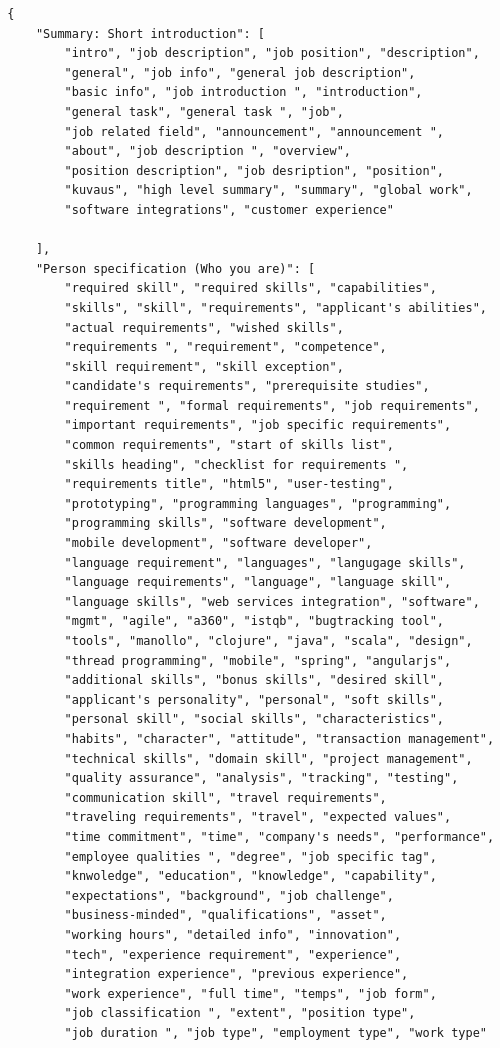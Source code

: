 \begin{verbatim}
  {
      "Summary: Short introduction": [
          "intro", "job description", "job position", "description",
          "general", "job info", "general job description",
          "basic info", "job introduction ", "introduction",
          "general task", "general task ", "job",
          "job related field", "announcement", "announcement ",
          "about", "job description ", "overview",
          "position description", "job desription", "position",
          "kuvaus", "high level summary", "summary", "global work",
          "software integrations", "customer experience"

      ],
      "Person specification (Who you are)": [
          "required skill", "required skills", "capabilities",
          "skills", "skill", "requirements", "applicant's abilities",
          "actual requirements", "wished skills",
          "requirements ", "requirement", "competence",
          "skill requirement", "skill exception",
          "candidate's requirements", "prerequisite studies",
          "requirement ", "formal requirements", "job requirements",
          "important requirements", "job specific requirements",
          "common requirements", "start of skills list",
          "skills heading", "checklist for requirements ",
          "requirements title", "html5", "user-testing",
          "prototyping", "programming languages", "programming",
          "programming skills", "software development",
          "mobile development", "software developer",
          "language requirement", "languages", "langugage skills",
          "language requirements", "language", "language skill",
          "language skills", "web services integration", "software",
          "mgmt", "agile", "a360", "istqb", "bugtracking tool",
          "tools", "manollo", "clojure", "java", "scala", "design",
          "thread programming", "mobile", "spring", "angularjs",
          "additional skills", "bonus skills", "desired skill",
          "applicant's personality", "personal", "soft skills",
          "personal skill", "social skills", "characteristics",
          "habits", "character", "attitude", "transaction management",
          "technical skills", "domain skill", "project management",
          "quality assurance", "analysis", "tracking", "testing",
          "communication skill", "travel requirements",
          "traveling requirements", "travel", "expected values",
          "time commitment", "time", "company's needs", "performance",
          "employee qualities ", "degree", "job specific tag",
          "knwoledge", "education", "knowledge", "capability",
          "expectations", "background", "job challenge",
          "business-minded", "qualifications", "asset",
          "working hours", "detailed info", "innovation",
          "tech", "experience requirement", "experience",
          "integration experience", "previous experience",
          "work experience", "full time", "temps", "job form",
          "job classification ", "extent", "position type",
          "job duration ", "job type", "employment type", "work type"


\end{verbatim}
